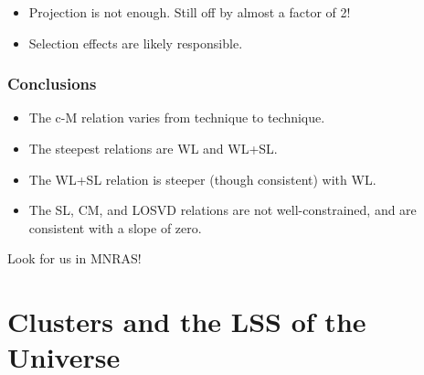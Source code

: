 \documentclass[hyperref={pdfpagelabels=false}]{beamer}
\begin{document}
\begin{frame}
\begin{columns}
\begin{column}{0.5\textwidth}
\begin{figure}
      \end{figure}  
    \end{column}
  \end{columns}
  \begin{itemize}
  \item Projection is not enough. Still off by almost a factor of 2!
  \item Selection effects are likely responsible.
  \end{itemize}
\end{frame}

\begin{frame}
\frametitle{Conclusions}
\begin{block}{}
\begin{itemize}
\item {\large The c-M relation varies from technique to technique.}
\item {\large The steepest relations are WL and WL+SL.}
\item {\large The WL+SL relation is steeper (though consistent) with WL.}
\item {\large The SL, CM, and LOSVD relations are not well-constrained, and
    are consistent with a slope of zero.}
\end{itemize}
\end{block}
\centerline{Look for us in MNRAS!}
\end{frame}

\section{Clusters and the LSS of the Universe}
\end{document}
